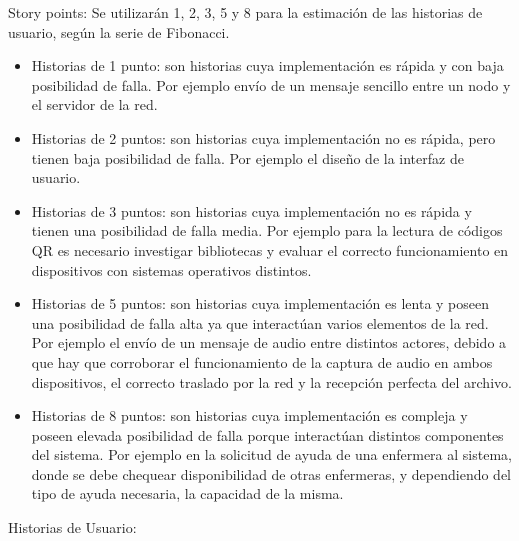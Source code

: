 \documentclass[
11pt, %
]{charter}
\begin{document}
Story points:
Se utilizarán 1, 2, 3, 5 y 8 para la estimación de las historias de usuario, según la serie de Fibonacci.
\begin{itemize}
	\item Historias de 1 punto: son historias cuya implementación es rápida 	y con baja posibilidad de falla. Por ejemplo envío de un mensaje 			sencillo entre un nodo y el servidor de la red.
	\item Historias de 2 puntos: son historias cuya implementación no es rápida, pero tienen baja posibilidad de falla. Por ejemplo el diseño de la interfaz de usuario.
	\item Historias de 3 puntos: son historias cuya implementación no es rápida y tienen una posibilidad de falla media. Por ejemplo para la lectura de códigos QR es necesario investigar bibliotecas y evaluar el correcto funcionamiento en dispositivos con sistemas operativos distintos.
	\item Historias de 5 puntos: son historias cuya implementación es lenta y poseen una posibilidad de falla alta ya que interactúan varios elementos de la red. Por ejemplo el envío de un mensaje de audio entre distintos actores, debido a que hay que corroborar el funcionamiento de la captura de audio en ambos dispositivos, el correcto traslado por la red y la recepción perfecta del archivo.
	\item Historias de 8 puntos: son historias cuya implementación es compleja y poseen  elevada posibilidad de falla porque interactúan distintos componentes del sistema. Por ejemplo en la solicitud de ayuda de una enfermera al sistema, donde se debe chequear disponibilidad de otras enfermeras, y dependiendo del tipo de ayuda necesaria, la capacidad de la misma.

\end{itemize}

Historias de Usuario:
\end{document}
